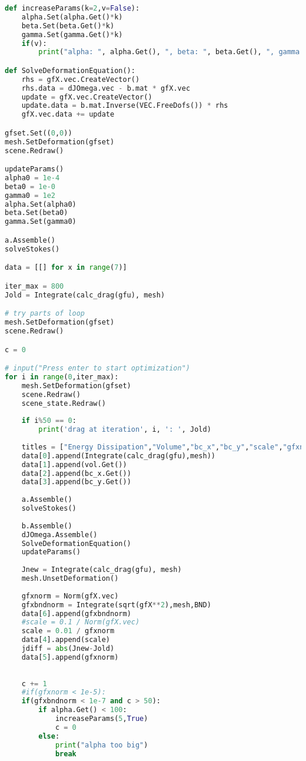 \begin{appendix}
\begin{lstlisting}[language=Python, title=NGSolve Shape Optimization Code in Python, label=final_code]
def increaseParams(k=2,v=False):
    alpha.Set(alpha.Get()*k)
    beta.Set(beta.Get()*k)
    gamma.Set(gamma.Get()*k)
    if(v):
        print("alpha: ", alpha.Get(), ", beta: ", beta.Get(), ", gamma: ", gamma.Get())

def SolveDeformationEquation():
    rhs = gfX.vec.CreateVector()
    rhs.data = dJOmega.vec - b.mat * gfX.vec
    update = gfX.vec.CreateVector()
    update.data = b.mat.Inverse(VEC.FreeDofs()) * rhs
    gfX.vec.data += update

gfset.Set((0,0))
mesh.SetDeformation(gfset)
scene.Redraw()

updateParams()
alpha0 = 1e-4
beta0 = 1e-0
gamma0 = 1e2
alpha.Set(alpha0)
beta.Set(beta0)
gamma.Set(gamma0)

a.Assemble()
solveStokes()

data = [[] for x in range(7)]

iter_max = 800
Jold = Integrate(calc_drag(gfu), mesh)

# try parts of loop
mesh.SetDeformation(gfset)
scene.Redraw()

c = 0

# input("Press enter to start optimization")
for i in range(0,iter_max):
    mesh.SetDeformation(gfset)
    scene.Redraw()
    scene_state.Redraw()
    
    if i%50 == 0:
        print('drag at iteration', i, ': ', Jold)
        
    titles = ["Energy Dissipation","Volume","bc_x","bc_y","scale","gfxnorm","gfxbndnorm"] # collecting data
    data[0].append(Integrate(calc_drag(gfu),mesh))
    data[1].append(vol.Get())
    data[2].append(bc_x.Get())
    data[3].append(bc_y.Get())
    
    a.Assemble()
    solveStokes()
    
    b.Assemble()
    dJOmega.Assemble()
    SolveDeformationEquation()
    updateParams()
    
    Jnew = Integrate(calc_drag(gfu), mesh)
    mesh.UnsetDeformation()
    
    gfxnorm = Norm(gfX.vec)
    gfxbndnorm = Integrate(sqrt(gfX**2),mesh,BND)
    data[6].append(gfxbndnorm)
    #scale = 0.1 / Norm(gfX.vec)
    scale = 0.01 / gfxnorm
    data[4].append(scale)
    jdiff = abs(Jnew-Jold)
    data[5].append(gfxnorm)
    
    
    c += 1
    #if(gfxnorm < 1e-5):
    if(gfxbndnorm < 1e-7 and c > 50):
        if alpha.Get() < 100:
            increaseParams(5,True)
            c = 0
        else:
            print("alpha too big")
            break
            

\end{lstlisting}
\end{appendix}
